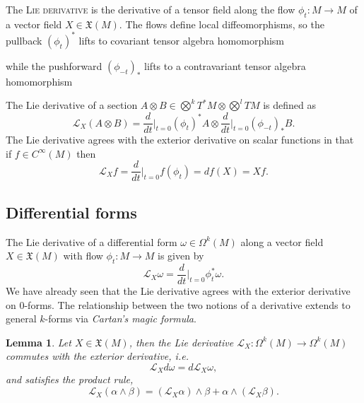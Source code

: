 \documentclass[reqno]{amsart}
\newtheorem{lemma}[theorem]{Lemma}
\theoremstyle{definition}
\theoremstyle{remark}
\renewcommand{\emph}{\textsc}
\begin{document}
The \emph{Lie derivative} is the derivative of a tensor field along the flow $\phi_t : M \to M$ of a vector field $X \in \mathfrak X (M)$. The flows define local diffeomorphisms, so the pullback $(\phi_t)^*$ lifts to covariant tensor algebra homomorphism 
	\begin{center}
	\end{center}
while the pushforward $(\phi_{-t})_*$ lifts to a contravariant tensor algebra homomorphism 
	\begin{center}
	\end{center}
The Lie derivative of a section $A \otimes B \in \bigotimes^k T^*M \otimes \bigotimes^l TM$ is defined as
	\[ \mathcal L_X (A \otimes B) = \frac{d}{dt}\Big|_{t = 0} (\phi_t)^* A \otimes \frac{d}{dt}\Big|_{t = 0} (\phi_{-t})_* B. \]
The Lie derivative agrees with the exterior derivative on scalar functions in that if $f \in C^\infty (M)$ then 
	\[ \mathcal L_X f = \frac{d}{dt} \Big|_{t = 0} f(\phi_t) = df (X) = Xf. \]

\subsection{Differential forms}

The Lie derivative of a differential form $\omega \in \Omega^k (M)$ along a vector field $X \in \mathfrak X (M)$ with flow $\phi_t : M \to M$ is given by 
	\[ \mathcal L_X \omega = \frac{d}{dt} \Big|_{t = 0} \phi^*_t \omega. \]
We have already seen that the Lie derivative agrees with the exterior derivative on $0$-forms. The relationship between the two notions of a derivative extends to general $k$-forms via \textit{Cartan's magic formula}. 	
	
\begin{lemma}
	Let $X \in \mathfrak X (M)$, then the Lie derivative $\mathcal L_X : \Omega^k (M) \to \Omega^k (M)$ commutes with the exterior derivative, i.e.
		\[  \mathcal L_X d\omega = d \mathcal L_X \omega,\]
	and satisfies the product rule, 
		\[ \mathcal L_X (\alpha \wedge \beta) = (\mathcal L_X \alpha) \wedge \beta + \alpha \wedge ( \mathcal L_X \beta). \]	
\end{lemma}
\end{document}
